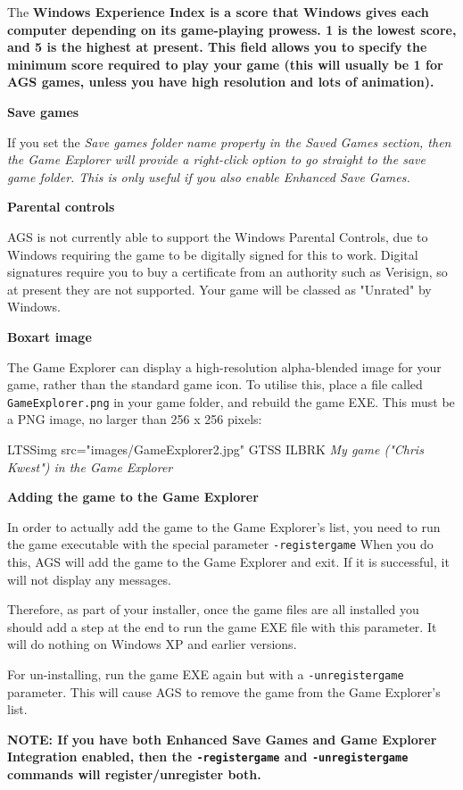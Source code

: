 The \bf{Windows Experience Index} is a score that Windows gives each computer depending
on its game-playing prowess. 1 is the lowest score, and 5 is the highest at present.
This field allows you to specify the minimum score required to play your game (this
will usually be 1 for AGS games, unless you have high resolution and lots of animation).

\bf{Save games}

If you set the \it{Save games folder name} property in the Saved Games section, then
the Game Explorer will provide a right-click option to go straight to the save game folder.
This is only useful if you also enable Enhanced Save Games.

\bf{Parental controls}

AGS is not currently able to support the Windows Parental Controls, due to Windows requiring
the game to be digitally signed for this to work. Digital signatures require you to buy
a certificate from an authority such as Verisign, so at present they are not supported.
Your game will be classed as "Unrated" by Windows.

\bf{Boxart image}

The Game Explorer can display a high-resolution alpha-blended image for your game, rather
than the standard game icon. To utilise this, place a file called \verb$GameExplorer.png$
in your game folder, and rebuild the game EXE. This must be a PNG image, no larger
than 256 x 256 pixels:

LTSSimg src="images/GameExplorer2.jpg" GTSS ILBRK
\it{My game ("Chris Kwest") in the Game Explorer}

\bf{Adding the game to the Game Explorer}

In order to actually add the game to the Game Explorer's list, you need to run the
game executable with the special parameter \verb$-registergame$  When you do this,
AGS will add the game to the Game Explorer and exit. If it is successful, it will
not display any messages.

Therefore, as part of your installer, once the game files are all installed you should
add a step at the end to run the game EXE file with this parameter. It will do nothing
on Windows XP and earlier versions.

For un-installing, run the game EXE again but with a  \verb$-unregistergame$  parameter.
This will cause AGS to remove the game from the Game Explorer's list.

\bf{NOTE:} If you have both Enhanced Save Games and Game Explorer Integration enabled,
then the \verb$-registergame$ and \verb$-unregistergame$ commands will register/unregister
both.

